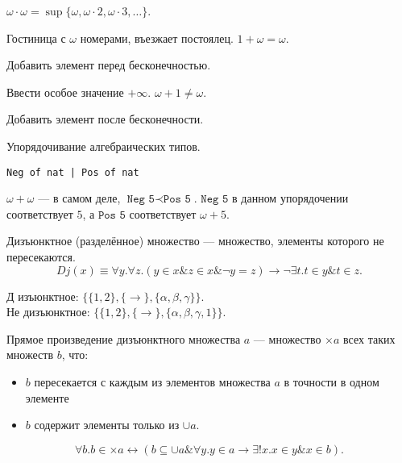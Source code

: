 \begin{example}
   $\omega \cdot \omega = \sup\{\omega,\omega\cdot 2, \omega\cdot 3, \dots\}
   $.
\end{example}

\begin{example}
   Гостиница с $\omega$ номерами, въезжает постоялец.  $1 + \omega = \omega$.

   Добавить элемент перед бесконечностью.
\end{example}
\begin{example}
   Ввести особое значение $+\infty$.
   $\omega + 1 \ne \omega$.

   Добавить элемент после бесконечности.\end{example}
\begin{example}
   Упорядочивание алгебраических типов.

\texttt{Neg of nat | Pos of nat}

$\omega + \omega$ --- в самом деле, $\texttt{Neg 5} \prec \texttt{Pos 5}$. $\texttt{Neg 5}$ в данном упорядочении
соответствует $5$, а $\texttt{Pos 5}$ соответствует $\omega + 5$.

\end{example}

\begin{definition}
   Дизъюнктное (разделённое) множество --- множество, элементы которого не пересекаются.
\[ Dj(x) \equiv \forall y.\forall z.(y \in x \& z \in x \& \neg y=z) \rightarrow \neg \exists t.t \in y \& t \in z.\]
\end{definition}

\begin{example}Д
   изъюнктное: $\{\{1,2\},\{\rightarrow\},\{\alpha,\beta,\gamma\}\}$.\\
   Не дизъюнктное: $\{\{1,2\},\{\rightarrow\},\{\alpha,\beta,\gamma,1\}\}$.
\end{example}


\begin{definition}
   Прямое произведение дизъюнктного множества $a$ --- множество $\times a$ всех таких множеств $b$, что:

   \begin{itemize}
\item $b$ пересекается с каждым из элементов множества $a$ в точности в одном элементе
\item $b$ содержит элементы только из $\cup a$.
\end{itemize}

\[ \forall b .b \in \times a \leftrightarrow (b \subseteq \cup a \& \forall y .y \in a \rightarrow \exists ! x .x \in y \& x \in b). \]
\end{definition}

